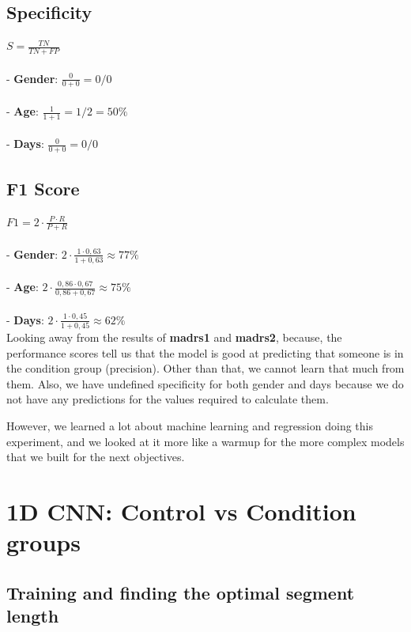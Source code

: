 \begin{multicols}{2}
\subsection{Specificity}
$ S = \frac{TN}{TN+FP} $
\\\\
- \textbf{Gender}: $\frac{0}{0+0} = 0/0$\\\\
- \textbf{Age}: $\frac{1}{1+1} = 1/2 = 50\%$\\\\
- \textbf{Days}: $\frac{0}{0+0} = 0/0$\\

\end{multicols}

\subsection{F1 Score}
$ F1 = 2 \cdot \frac{P \cdot R}{P + R} $
\\\\
- \textbf{Gender}: $2 \cdot \frac{1 \cdot 0,63}{1 + 0,63} \approx 77\%$\\\\
- \textbf{Age}: $2 \cdot \frac{0,86 \cdot 0,67}{0,86 + 0,67} \approx 75\%$\\\\
- \textbf{Days}: $2 \cdot \frac{1 \cdot 0,45}{1 + 0,45} \approx 62\%$\\

Looking away from the results of \textbf{madrs1} and \textbf{madrs2}, because, the performance scores tell us that the model is good at predicting that someone is in the condition group (precision). Other than that, we cannot learn that much from them. Also, we have undefined specificity for both gender and days because we do not have any predictions for the values required to calculate them. 

However, we learned a lot about machine learning and regression doing this experiment, and we looked at it more like a warmup for the more complex models that we built for the next objectives.

\section{1D CNN: Control vs Condition groups}

\subsection{Training and finding the optimal segment length}


